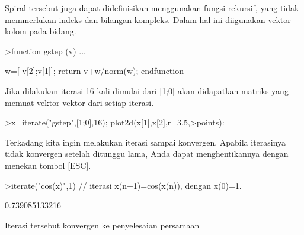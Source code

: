 \documentclass[a4paper,10pt]{article}
\begin{document}
\begin{eulernotebook}
\begin{eulercomment}
\begin{eulercomment}
\begin{eulercomment}
\begin{eulercomment}
\begin{eulercomment}
\begin{eulercomment}
\begin{eulercomment}
\begin{eulercomment}
\begin{eulercomment}
\begin{eulercomment}
\begin{eulercomment}
\begin{eulercomment}
\begin{eulercomment}
\begin{eulercomment}
\begin{eulercomment}
\begin{eulercomment}
\begin{eulercomment}
\begin{eulercomment}
\begin{eulercomment}
\begin{eulercomment}
\begin{eulercomment}
\begin{eulercomment}
\begin{eulercomment}
\begin{eulercomment}
\begin{eulercomment}
\begin{eulercomment}
\begin{eulercomment}
\begin{eulercomment}
\begin{eulercomment}
\begin{eulercomment}
\begin{eulercomment}
Spiral tersebut juga dapat didefinisikan menggunakan fungsi rekursif,
yang tidak memmerlukan indeks dan bilangan kompleks. Dalam hal ini
diigunakan vektor kolom pada bidang.
\end{eulercomment}
\begin{eulerprompt}
>function gstep (v) ...
\end{eulerprompt}
\begin{eulerudf}
  w=[-v[2];v[1]];
  return v+w/norm(w);
  endfunction
\end{eulerudf}
\begin{eulercomment}
Jika dilakukan iterasi 16 kali dimulai dari [1;0] akan didapatkan
matriks yang memuat vektor-vektor dari setiap iterasi.
\end{eulercomment}
\begin{eulerprompt}
>x=iterate("gstep",[1;0],16); plot2d(x[1],x[2],r=3.5,>points):
\end{eulerprompt}
\begin{eulercomment}
\begin{eulercomment}
\begin{eulercomment}
Terkadang kita ingin melakukan iterasi sampai konvergen. Apabila
iterasinya tidak konvergen setelah ditunggu lama, Anda dapat
menghentikannya dengan menekan tombol [ESC].
\end{eulercomment}
\begin{eulerprompt}
>iterate("cos(x)",1) // iterasi x(n+1)=cos(x(n)), dengan x(0)=1.
\end{eulerprompt}
\begin{euleroutput}
  0.739085133216
\end{euleroutput}
\begin{eulercomment}
Iterasi tersebut konvergen ke penyelesaian persamaan


\end{eulercomment}
\end{eulercomment}
\end{eulercomment}
\end{eulercomment}
\end{eulercomment}
\end{eulercomment}
\end{eulercomment}
\end{eulercomment}
\end{eulercomment}
\end{eulercomment}
\end{eulercomment}
\end{eulercomment}
\end{eulercomment}
\end{eulercomment}
\end{eulercomment}
\end{eulercomment}
\end{eulercomment}
\end{eulercomment}
\end{eulercomment}
\end{eulercomment}
\end{eulercomment}
\end{eulercomment}
\end{eulercomment}
\end{eulercomment}
\end{eulercomment}
\end{eulercomment}
\end{eulercomment}
\end{eulercomment}
\end{eulercomment}
\end{eulercomment}
\end{eulercomment}
\end{eulercomment}
\end{eulercomment}
\end{eulernotebook}
\end{document}
